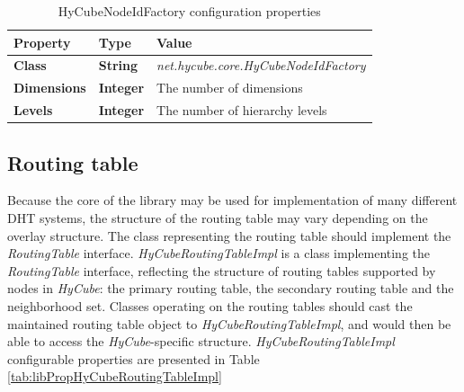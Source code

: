 \begin{table}
\scriptsize
\begin{center}
\begin{tabular}{p{3cm} p{3cm} p{8.5cm}}
	\hline
	\textbf{Property}			& \textbf{Type}				& \textbf{Value}					\\[1mm]
    \hline
	\textbf{Class}				& \textbf{String}			& \textit{net.hycube.core.HyCubeNodeIdFactory}				\\[1.5mm]
    \textbf{Dimensions}			& \textbf{Integer}			& The number of dimensions									\\[1.5mm]
	\textbf{Levels}				& \textbf{Integer}			& The number of hierarchy levels							\\[1.5mm]
    \hline
\end{tabular}
\end{center}
\caption{HyCubeNodeIdFactory configuration properties}
\label{tab:libPropHyCubeNodeIdFactory}
\end{table}



\subsection{Routing table}

Because the core of the library may be used for implementation of many different DHT systems, the structure of the routing table may vary depending on the overlay structure. The class representing the routing table should implement the \emph{RoutingTable} interface. \emph{HyCubeRoutingTableImpl} is a class implementing the \emph{RoutingTable} interface, reflecting the structure of routing tables supported by nodes in \emph{HyCube}: the primary routing table, the secondary routing table and the neighborhood set. Classes operating on the routing tables should cast the maintained routing table object to \emph{HyCubeRoutingTableImpl}, and would then be able to access the \emph{HyCube}-specific structure. \emph{HyCubeRoutingTableImpl} configurable properties are presented in Table \ref{tab:libPropHyCubeRoutingTableImpl} 

